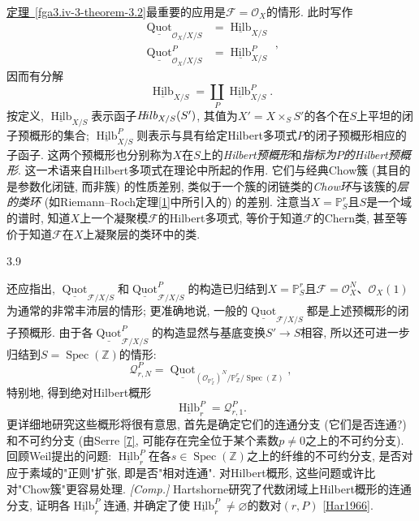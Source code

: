 \par{}\hyperref[fga3.iv-3-theorem-3.2]{定理~\ref*{fga3.iv-3-theorem-3.2}}最重要的应用是\(\mathscr {F}=\mathcal {O}_X\)的情形. 此时写作\[     
\begin {aligned}       \underline {\operatorname {Quot}}_{\mathcal {O}_X/X/S}       &= \underline {\operatorname {Hilb}}_{X/S}     \\\underline {\operatorname {Quot}}_{\mathcal {O}_X/X/S}^P       &= \underline {\operatorname {Hilb}}_{X/S}^P     
\end {aligned},\] 因而有分解\[     \underline {\operatorname {Hilb}}_{X/S}     = \coprod _P \underline {\operatorname {Hilb}}_{X/S}^P.\] 按定义, \(\underline {\operatorname {Hilb}}_{X/S}\)表示函子\(\mathscr {H}\kern  -1.75pt\mathit {ilb}_{X/S} (S')\), 其值为\(X'=X\times _S S'\)的各个在\(S\)上平坦的闭子预概形的集合; \(\underline {\operatorname {Hilb}}_{X/S}^P\)则表示与具有给定Hilbert多项式\(P\)的闭子预概形相应的子函子. 这两个预概形也分别称为\(X\)在\(S\)上的\emph{Hilbert预概形}和\emph{指标为\(P\)的Hilbert预概形}. 这一术语来自Hilbert多项式在理论中所起的作用. 它们与经典Chow簇 (其目的是参数化闭链, 而非簇) 的性质差别, 类似于一个簇的闭链类的\emph{Chow环}与该簇的\emph{层的类环} (如Riemann–Roch定理\hyperref[BS1958]{[1]}中所引入的) 的差别. 注意当\(X=\mathbb {P}_S^r\)且\(S\)是一个域的谱时, 知道\(X\)上一个凝聚模\(\mathscr {F}\)的Hilbert多项式, 等价于知道\(\mathscr {F}\)的Chern类, 甚至等价于知道\(\mathscr {F}\)在\(X\)上凝聚层的类环中的类.
\begin{remarks}{3.9}\label{fga3.iv-3-remarks-3.9}\skipsinglepar
\par{}还应指出, \(\underline {\operatorname {Quot}}_{{\mathscr {F}/X/S}}\)和\(\underline {\operatorname {Quot}}_{{\mathscr {F}/X/S}}^P\)的构造已归结到\(X=\mathbb {P}_S^r\)且\(\mathscr {F}=\mathcal {O}_X^N\)、\(\mathcal {O}_X(1)\)为通常的非常丰沛层的情形; 更准确地说, 一般的\(\underline {\operatorname {Quot}}_{{\mathscr {F}/X/S}}\)都是上述预概形的闭子预概形. 由于各\(\underline {\operatorname {Quot}}_{{\mathscr {F}/X/S}}^P\)的构造显然与基底变换\(S'\to  S\)相容, 所以还可进一步归结到\(S=\operatorname {Spec}(\mathbb {Z})\)的情形: \[       \mathscr {Q}_{r,N}^P       = \underline {\operatorname {Quot}}_{(\mathcal {O}_{\mathbb {P}_{\mathbb {Z}}^r})^N/\mathbb {P}_{\mathbb {Z}}^r/\operatorname {Spec}(\mathbb {Z})},\] 特别地, 得到绝对Hilbert概形\[       \underline {\operatorname {Hilb}}_r^P       = \mathscr {Q}_{r,1}^P.\] 更详细地研究这些概形将很有意思, 首先是确定它们的连通分支 (它们是否连通?) 和不可约分支 (由Serre \hyperref[Ser1961]{[7]}, 可能存在完全位于某个素数\(p\neq 0\)之上的不可约分支). 回顾Weil提出的问题: \(\underline {\operatorname {Hilb}}_r^P\)在各\(s\in \operatorname {Spec}(\mathbb {Z})\)之上的纤维的不可约分支, 是否对应于素域的"正则"扩张, 即是否"相对连通". 对Hilbert概形, 这些问题或许比对"Chow簇"更容易处理. \emph{[Comp.]} Hartshorne研究了代数闭域上Hilbert概形的连通分支, 证明各\(\underline {\operatorname {Hilb}}_r^P\)连通, 并确定了使\(\underline {\operatorname {Hilb}}_r^P\neq \varnothing \)的数对\((r,P)\) \hyperref[Har1966]{[Har1966]}.
\end{remarks}
